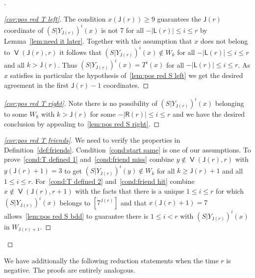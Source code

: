 \documentclass[10pt]{amsart}
\theoremstyle{definition}\newtheorem{defi}[theo]{Definition}\newtheorem{rema}[theo]{Remark}\newtheorem{exam}[theo]{Example}\newtheorem{exem}[theo]{Example}\newtheorem{nota}[theo]{Notation}
\DeclareMathOperator{\bad}{\mathsf{V}}
\newcommand{\lft}{\mathsf{L}}
\newcommand{\rht}{\mathsf{R}}
\newcommand{\scl}{\mathsf{J}}
\newenvironment{proofc}[1][\proofname]{\begin{proof}[#1]}{\end{proof}}
\begin{document}
\begin{proofc}
\begin{proof}[{\eqref{cor:pos red T left}}]
The condition $x(\scl(r)) \ge 9$ guarantees the $\scl(r)$ coordinate of $(S|Y_{\scl(r)})^i(x)$ is not 7 for all $-|\lft(r)|
\le i\le r$ by Lemma~\ref{lem:need it later}. Together with the assumption that $x$ does not belong to $\bad(\scl(r),r)$ it follows that $(S|Y_{\scl(r)})^i(x) \notin W_k$ for all $-|\lft(r)| \le i \le r$ and all $k > \scl(r)$. Thus $(S|Y_{\scl(r)})^i(x) = T^i(x)$ for all $-|\lft(r)| \le i\le r$. As $x$ satisfies in particular the hypothesis of~\eqref{lem:pos red S left} we get the desired agreement in the first $\scl(r)-1$ coordinates.
\let\qed\relax
\end{proof}

\begin{proof}[{\eqref{cor:pos red T right}}]
Note there is no possibility of $(S|Y_{\scl(r)})^i(x)$ belonging to some $W_k$ with $k > \scl(r)$ for some $-|\rht(r)| \le i \le r$ and we have the desired conclusion by appealing to~\eqref{lem:pos red S right}.
\let\qed\relax
\end{proof}

\begin{proof}[{\eqref{cor:pos red T friends}}]
We need to verify the properties in Definition~\ref{def:friends}. Condition~\eqref{cond:start same} is one of our assumptions. To prove~\eqref{cond:T defined 1} and~\eqref{cond:friend miss} combine $y \not\in \bad(\scl(r),r)$ with $y(\scl(r) + 1) = 3$ to get $(S|Y_{\scl(r)})^i(y) \not\in W_k$ for all $k \ge \scl(r)+1$ and all $1 \le i
\le r$. For~\eqref{cond:T defined 2} and~\eqref{cond:friend hit} combine $x
\not\in \bad(\scl(r),r+1)$ with the facts that there is a unique $1 \le i \le r$ for which $(S|Y_{\scl(r)})^i(x)$ belongs to $[7^{\scl(r)}]$ and that $x(\scl(r) + 1) = 7$ allows~\eqref{lem:pos red S bdd} to guarantee there is $1
\le i < r$ with $(S|Y_{\scl(r)})^i(x)$ in $W_{\scl(r)+1}$.
\end{proof}\let\qed\relax
\end{proofc}

We have additionally the following reduction statements when the time $r$ is negative. The proofs are entirely analogous.
\end{document}
